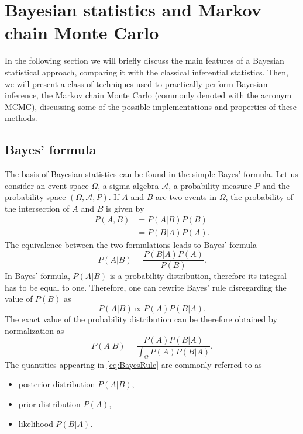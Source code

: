 \section{Bayesian statistics and Markov chain Monte Carlo}\label{sec:ONE}

In the following section we will briefly discuss the main features of a Bayesian statistical approach, comparing it with the classical inferential statistics. Then, we will present a class of techniques used to practically perform Bayesian inference, the Markov chain Monte Carlo (commonly denoted with the acronym MCMC), discussing some of the possible implementations and properties of these methods.
\subsection{Bayes' formula}
The basis of Bayesian statistics can be found in the simple Bayes' formula. Let us consider an event space $\Omega$, a sigma-algebra $\mathcal{A}$, a probability measure $P$ and the probability space $(\Omega, \mathcal{A}, P)$. If $A$ and $B$ are two events in $\Omega$, the probability of the intersection of $A$ and $B$ is given by
\begin{equation}
\begin{aligned}
	P(A, B) &= P(A|B)P(B) \\
	&= P(B|A)P(A).
\end{aligned}
\end{equation}
The equivalence between the two formulations leads to Bayes' formula
\begin{equation}\label{eq:BayesRule}
	P(A|B) = \frac{P(B|A)P(A)}{P(B)}.
\end{equation}
In Bayes' formula, $P(A|B)$ is a probability distribution, therefore its integral has to be equal to one. Therefore, one can rewrite Bayes' rule disregarding the value of $P(B)$ as
\begin{equation}
	P(A|B) \propto P(A)P(B|A).
\end{equation}
The exact value of the probability distribution can be therefore obtained by normalization as
\begin{equation}
	P(A|B) = \frac{P(A)P(B|A)}{\int_{\Omega}P(A)P(B|A)}.
\end{equation}
The quantities appearing in \eqref{eq:BayesRule} are commonly referred to as
\begin{itemize}
	\item posterior distribution $P(A|B)$,
	\item prior distribution $P(A)$,
	\item likelihood $P(B|A)$.
\end{itemize} 

